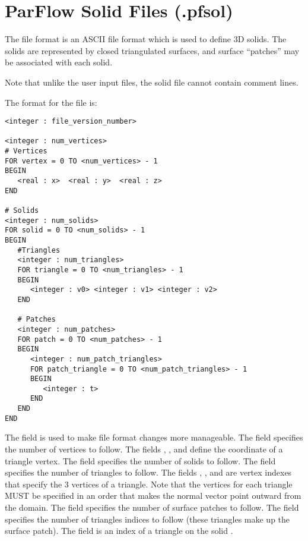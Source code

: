 
\section{ParFlow Solid Files (.pfsol)}
\label{ParFlow Solid Files (.pfsol)}

The  file format is an ASCII file format which is
used to define 3D solids.
The solids are represented by closed triangulated surfaces,
and surface ``patches'' may be associated with each solid.

Note that unlike the user input files, the solid file cannot contain comment
lines. 

The format for the file is:

\begin{display}\begin{verbatim}
<integer : file_version_number>

<integer : num_vertices>
# Vertices
FOR vertex = 0 TO <num_vertices> - 1
BEGIN
   <real : x>  <real : y>  <real : z>
END

# Solids
<integer : num_solids>
FOR solid = 0 TO <num_solids> - 1
BEGIN
   #Triangles
   <integer : num_triangles>
   FOR triangle = 0 TO <num_triangles> - 1
   BEGIN
      <integer : v0> <integer : v1> <integer : v2>
   END

   # Patches
   <integer : num_patches>
   FOR patch = 0 TO <num_patches> - 1
   BEGIN
      <integer : num_patch_triangles>
      FOR patch_triangle = 0 TO <num_patch_triangles> - 1
      BEGIN
         <integer : t>
      END
   END
END
\end{verbatim}\end{display}

\noindent
The field  is used to make file format changes
more manageable.
The field  specifies the number of vertices to follow.
The fields , , and  define the coordinate
of a triangle vertex.
The field  specifies the number of solids to follow.
The field  specifies the number of triangles to follow.
The fields , , and  are vertex indexes
that specify the 3 vertices of a triangle.  Note that the vertices for each
triangle MUST be specified in an order that makes the normal vector point
outward from the domain.
The field  specifies the number of surface patches
to follow.
The field  specifies the number of triangles
indices to follow (these triangles make up the surface patch).
The field  is an index of a triangle on the solid .

